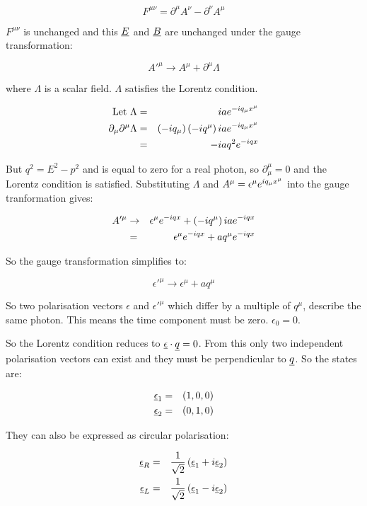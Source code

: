 \[
  F^{\mu\nu} = \partial^{\mu}A^{\nu} - \partial^{\nu}A^{\mu}
\]

$F^{\mu\nu}$ is unchanged and this $\underline{E}$ and $\underline{B}$ are unchanged under the gauge transformation:

\[
  A'^{\mu} \to A^{\mu} + \partial^{\mu}\Lambda
\]

where $\Lambda$ is a scalar field.  $\Lambda$ satisfies the Lorentz condition.

\begin{eqnarray*}
  \textrm{Let } \Lambda & = & iae^{-iq_{\mu}x^{\mu}} \\
  \partial_{\mu}\partial^{\mu}\Lambda & = & \left(-iq_{\mu}\right)\left(-iq^{\mu}\right)iae^{-iq_{\mu}x^{\mu}} \\
  & = & -iaq^2e^{-iqx}
\end{eqnarray*}

But $q^2 = E^2 - p^2$ and is equal to zero for a real photon, so $\partial^{\mu}_{\mu} = 0$ and the Lorentz condition is satisfied.  Substituting $\Lambda$ and $A^{\mu} = \epsilon^{\mu}e^{iq_{\mu}x^{\mu}}$ into the gauge tranformation gives:

\begin{eqnarray*}
  A'^{\mu} & \to & \epsilon^{\mu}e^{-iqx} + \left(-iq^{\mu}\right)iae^{-iqx} \\
  & = & \epsilon^{\mu}e^{-iqx} + aq^{\mu}e^{-iqx}
\end{eqnarray*}

So the gauge transformation simplifies to:

\[
  \epsilon'^{\mu} \to \epsilon^{\mu} + aq^{\mu}
\]

So two polarisation vectors $\epsilon$ and $\epsilon'^{\mu}$ which differ by a multiple of $q^{\mu}$, describe the same photon.  This means the time component must be zero.  $\epsilon_0 = 0$.

So the Lorentz condition reduces to $\underline{\epsilon}\cdot\underline{q} = 0$.  From this only two independent polarisation vectors can exist and they must be perpendicular to $\underline{q}$.  So the states are:

\begin{eqnarray*}
  \underline{\epsilon}_1 & = & \left(1,0,0\right) \\
  \underline{\epsilon}_2 & = & \left(0,1,0\right)
\end{eqnarray*}

They can also be expressed as circular polarisation:

\begin{eqnarray*}
  \underline{\epsilon}_R & = & \frac{1}{\sqrt{2}}\left(\underline{\epsilon}_1 + i\underline{\epsilon}_2\right) \\
  \underline{\epsilon}_L & = & \frac{1}{\sqrt{2}}\left(\underline{\epsilon}_1 - i\underline{\epsilon}_2\right)
\end{eqnarray*}

